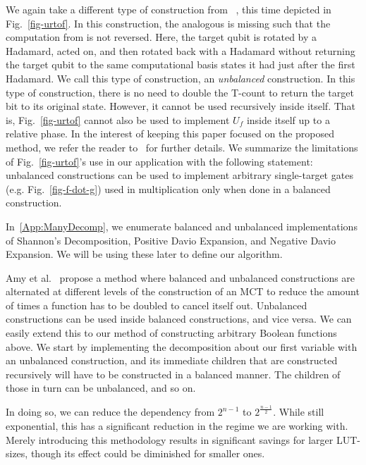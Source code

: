 We again take a different type of construction from ~\cite{bib-amy-phase-state}, this time
depicted in Fig.~\ref{fig-urtof}. In this construction, the analogous  is
missing such that the computation from  is not reversed. Here, the target qubit is rotated by
a Hadamard, acted on, and then rotated back with a Hadamard without returning the target qubit to the same
computational basis states it had just after the first Hadamard. We call this type of construction, an
\emph{unbalanced} construction. In this type of construction, there is no need to double the T-count 
to return the target bit to its original state. However, it cannot be used
recursively inside itself. That is, Fig.~\ref{fig-urtof} cannot also be used to implement $U_f$
inside itself up to a relative phase.  In the interest of keeping this paper focused on the proposed method, we refer the reader
to~\cite{bib-amy-phase-state} for further details. We summarize the limitations of Fig.~\ref{fig-urtof}'s use in
our application with the following statement: unbalanced constructions can be used to implement arbitrary
single-target gates (e.g. Fig.~\ref{fig-f-dot-g}) used in multiplication only when done in a balanced construction.

In~\ref{App:ManyDecomp}, we enumerate balanced and unbalanced implementations
of Shannon's Decomposition, Positive Davio Expansion, and Negative Davio Expansion. We will be using these
later to define our algorithm.


Amy et al.~\cite{bib-amy-phase-state} propose a method where balanced and unbalanced constructions are alternated at different levels of the
construction of an MCT to reduce the amount of times a function has to be doubled to cancel itself out. 
Unbalanced constructions can be used inside balanced constructions,
and vice versa. We can easily extend this to our method of constructing arbitrary Boolean functions above. We start by implementing the decomposition
about our first variable with an unbalanced construction, and its immediate children that are constructed recursively will have to be constructed
in a balanced manner. The children of those in turn can be unbalanced, and so on. 

In doing so, we can reduce the dependency from $2^{n-1}$ to $2^{\frac{n-1}{2}}$. While still exponential, this has
a significant reduction in the regime we are working with. Merely introducing this methodology results in
significant savings for larger LUT-sizes, though its effect could be diminished for smaller ones.

